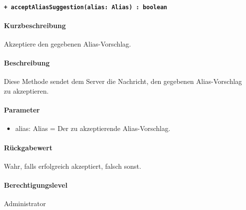 \paragraph{\texttt{+ acceptAliasSuggestion(alias: Alias) : boolean}}%
\paragraph*{Kurzbeschreibung}
Akzeptiere den gegebenen Alias-Vorschlag.
\paragraph*{Beschreibung}
Diese Methode sendet dem Server die Nachricht, den gegebenen Alias-Vorschlag zu akzeptieren.
\paragraph*{Parameter}
\begin{itemize}
    \item alias: Alias = Der zu akzeptierende Alias-Vorschlag.
\end{itemize}
\paragraph*{Rückgabewert}
Wahr, falls erfolgreich akzeptiert, falsch sonst.
\paragraph*{Berechtigungslevel}
Administrator